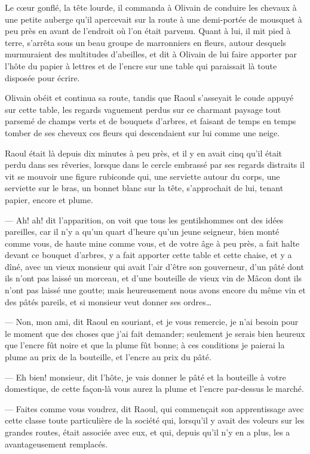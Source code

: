 Le cœur gonflé, la tête lourde, il commanda à Olivain de conduire les chevaux à une petite auberge qu'il apercevait sur la route à une demi-portée de mousquet à peu près en avant de l'endroit où l'on était parvenu. Quant à lui, il mit pied à terre, s'arrêta sous un beau groupe de marronniers en fleurs, autour desquels murmuraient des multitudes d'abeilles, et dit à Olivain de lui faire apporter par l'hôte du papier à lettres et de l'encre sur une table qui paraissait là toute disposée pour écrire.

Olivain obéit et continua sa route, tandis que Raoul s'asseyait le coude appuyé sur cette table, les regards vaguement perdus sur ce charmant paysage tout parsemé de champs verts et de bouquets d'arbres, et faisant de temps en temps tomber de ses cheveux ces fleurs qui descendaient sur lui comme une neige.

Raoul était là depuis dix minutes à peu près, et il y en avait cinq qu'il était perdu dans ses rêveries, lorsque dans le cercle embrassé par ses regards distraits il vit se mouvoir une figure rubiconde qui, une serviette autour du corps, une serviette sur le bras, un bonnet blanc sur la tête, s'approchait de lui, tenant papier, encore et plume.

— Ah! ah! dit l'apparition, on voit que tous les gentilshommes ont des idées pareilles, car il n'y a qu'un quart d'heure qu'un jeune seigneur, bien monté comme vous, de haute mine comme vous, et de votre âge à peu près, a fait halte devant ce bouquet d'arbres, y a fait apporter cette table et cette chaise, et y a dîné, avec un vieux monsieur qui avait l'air d'être son gouverneur, d'un pâté dont ils n'ont pas laissé un morceau, et d'une bouteille de vieux vin de Mâcon dont ils n'ont pas laissé une goutte; mais heureusement nous avons encore du même vin et des pâtés pareils, et si monsieur veut donner ses ordres\dots

— Non, mon ami, dit Raoul en souriant, et je vous remercie, je n'ai besoin pour le moment que des choses que j'ai fait demander; seulement je serais bien heureux que l'encre fût noire et que la plume fût bonne; à ces conditions je paierai la plume au prix de la bouteille, et l'encre au prix du pâté.

— Eh bien! monsieur, dit l'hôte, je vais donner le pâté et la bouteille à votre domestique, de cette façon-là vous aurez la plume et l'encre par-dessus le marché.

— Faites comme vous voudrez, dit Raoul, qui commençait son apprentissage avec cette classe toute particulière de la société qui, lorsqu'il y avait des voleurs sur les grandes routes, était associée avec eux, et qui, depuis qu'il n'y en a plus, les a avantageusement remplacés.


